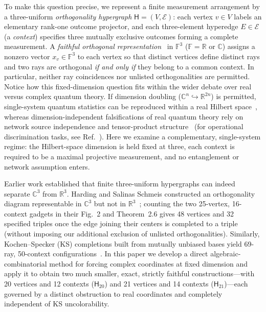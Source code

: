 \documentclass[twocolumn,aps,pra,floatfix,amsmath,amssymb,longbibliography]{revtex4-2}
\newenvironment{handrewrite}{\leavevmode\color{blue}}{}
\theoremstyle{definition}
\theoremstyle{remark}
\newcommand{\C}{\mathbb C}
\newcommand{\R}{\mathbb R}
\newcommand{\Htwenty}{\mathsf H_{20}}
\newcommand{\Htwentyone}{\mathsf H_{21}}
\begin{document}
\begin{handrewrite}
To make this question precise, we represent a finite measurement arrangement by a three-uniform \emph{orthogonality hypergraph} $\mathsf H=(V,\mathcal E)$: each vertex $v\in V$ labels an elementary rank-one outcome projector, and each three-element hyperedge $E\in\mathcal E$ (a \emph{context}) specifies three mutually exclusive outcomes forming a complete measurement.  A \emph{faithful orthogonal representation}~\cite{lovasz-79,Portillo-2015} in $\mathbb F^3$ ($\mathbb F=\R$ or $\C$) assigns a nonzero vector $x_v\in\mathbb F^3$ to each vertex so that distinct vertices define distinct rays and two rays are orthogonal \emph{if and only if} they belong to a common context.  In particular, neither ray coincidences nor unlisted orthogonalities are permitted.  Notice how this fixed-dimension question fits within the wider debate over real versus complex quantum theory.  If dimension doubling ($\C^n\hookrightarrow\R^{2n}$) is permitted, single-system quantum statistics can be reproduced within a real Hilbert space~\cite{McKague2009SimulatingRealHilbert,Hardy2012LimitedHolism,Aleksandrova2013UniversalQubit}, whereas dimension-independent falsifications of real quantum theory rely on network source independence and tensor-product structure~\cite{renou-2021,Weilenmann2025PartialIndependencePRL} (for operational discrimination tasks, see Ref.~\cite{Bednorz2022OptimalDiscrimination}).  Here we examine a complementary, single-system regime: the Hilbert-space dimension is held fixed at three, each context is required to be a maximal projective measurement, and no entanglement or network assumption enters.

Earlier work established that finite three-uniform hypergraphs can indeed separate $\C^3$ from $\R^3$.  Harding and Salinas Schmeis constructed an orthogonality diagram representable in $\C^3$ but not in $\R^3$~\cite{harding2025remarksIJTP}; counting the two 25-vertex, 16-context gadgets in their Fig.~2 and Theorem~2.6 gives 48 vertices and 32 specified triples once the edge joining their centers is completed to a triple (without imposing our additional exclusion of unlisted orthogonalities).  Similarly, Kochen--Specker (KS) completions built from mutually unbiased bases yield 69-ray, 50-context configurations~\cite{svozil-2025-MYOCHS}.  In this paper we develop a direct algebraic-combinatorial method for forcing complex coordinates at fixed dimension and apply it to obtain two much smaller, exact, strictly faithful constructions---with 20 vertices and 12 contexts ($\Htwenty$) and 21 vertices and 14 contexts ($\Htwentyone$)---each governed by a distinct obstruction to real coordinates and completely independent of KS uncolorability.


\end{handrewrite}
\end{document}
